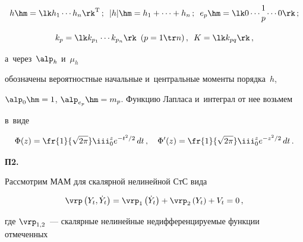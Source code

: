 {\noindent

 $$

 h \hm= \lk h_1 \cdots h_n\rk^{\mathrm{T}}\,;\enskip

|h|\hm = h_1 +\cdots + h_n\,;\enskip 

e_p \hm= \lk 0\cdots \begin{matrix}1\\ p\end{matrix}

  \cdots 0\rk\,;

  $$

  

  \noindent

  $$

  k_p = \lk k_{p_1} \cdots k_{p_n}\rk\enskip

(p= 1\tr n)\,, \enskip K=\lk k_{pq}\rk\,,

$$

  а~через~$\alp_h$ и~$\mu_h$ 

  обозначены вероятностные начальные и~центральные моменты порядка~$h$, 

  $\alp_0 \hm=1$, $\alp_{e_p}\hm= m_p$. Функцию Лапласа и~интеграл от нее возьмем 

  в~виде~\cite{1-s2, 2-s2}

    $$

    \Phi(z) = \fr{1}{\sqrt{2\pi}} \iii_0^z e^{-t^2/2} \,dt\,,\quad 

    \Phi'(z) = \fr{1}{\sqrt{2\pi}} \iii_0^z e^{-z^2/2}\, dt\,.

    $$













\medskip



\noindent

\textbf{П2.}\

Рассмотрим МАМ для скалярной нелинейной СтС вида

 \begin{equation}

 \vrp \left(Y_t, \dot Y_t\right) = \vrp_1 \left(\dot Y_t\right) 

 + \vrp_2 \left(Y_t\right) + V_t = 0\,,\label{p2.1-s2}

 \end{equation}

где $\vrp_{1,2}$~--- скалярные нелинейные недифференцируемые функции отмеченных 

}
